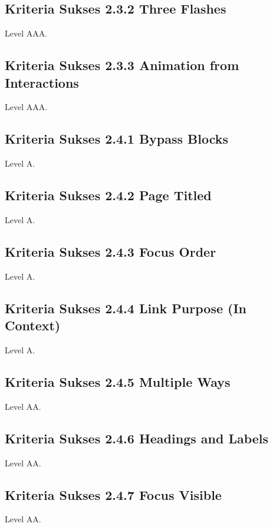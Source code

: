 \subsection{Kriteria Sukses 2.3.2 Three Flashes}
\label{sec:kriteria_2.3.2}
Level AAA.

\subsection{Kriteria Sukses 2.3.3 Animation from Interactions}
\label{sec:kriteria_2.3.3}
Level AAA.

\subsection{Kriteria Sukses 2.4.1 Bypass Blocks}
\label{sec:kriteria_2.4.1}
Level A.

\subsection{Kriteria Sukses 2.4.2 Page Titled}
\label{sec:kriteria_2.4.2}
Level A.

\subsection{Kriteria Sukses 2.4.3 Focus Order}
\label{sec:kriteria_2.4.3}
Level A.

\subsection{Kriteria Sukses 2.4.4 Link Purpose (In Context)}
\label{sec:kriteria_2.4.4}
Level A.

\subsection{Kriteria Sukses 2.4.5 Multiple Ways}
\label{sec:kriteria_2.4.5}
Level AA.

\subsection{Kriteria Sukses 2.4.6 Headings and Labels}
\label{sec:kriteria_2.4.6}
Level AA.

\subsection{Kriteria Sukses 2.4.7 Focus Visible}
\label{sec:kriteria_2.4.7}
Level AA.

